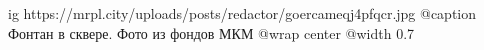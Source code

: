  
 
 
 
 

\ifcmt
  ig https://mrpl.city/uploads/posts/redactor/goercameqj4pfqcr.jpg
	@caption Фонтан в сквере. Фото из фондов МКМ
  @wrap center
  @width 0.7
\fi

